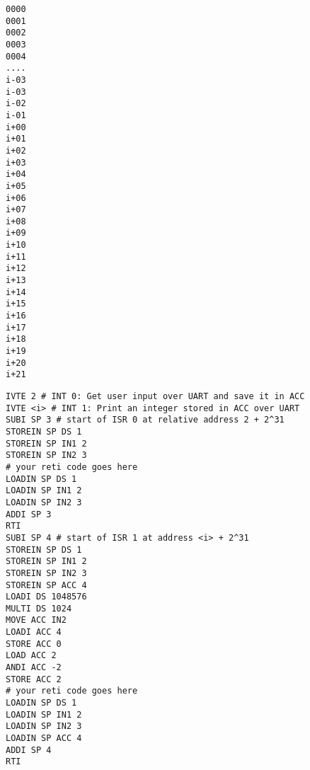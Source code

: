 \documentclass{article}
\newenvironment{adjustedminipage}[1]
{\vspace{0.1cm}\begin{minipage}[t]{#1}}
  {\end{minipage}\vspace{0.1cm}}
\begin{document}
\begin{adjustedminipage}{0.1\textwidth}
\begin{verbatim}
0000 
0001 
0002 
0003 
0004 
.... 
i-03 
i-03 
i-02 
i-01 
i+00 
i+01 
i+02 
i+03 
i+04 
i+05 
i+06 
i+07 
i+08 
i+09 
i+10 
i+11 
i+12 
i+13 
i+14 
i+15 
i+16 
i+17 
i+18 
i+19 
i+20 
i+21 
\end{verbatim}
\end{adjustedminipage}
\begin{adjustedminipage}{0.8\textwidth}
\begin{verbatim}
IVTE 2 # INT 0: Get user input over UART and save it in ACC
IVTE <i> # INT 1: Print an integer stored in ACC over UART 
SUBI SP 3 # start of ISR 0 at relative address 2 + 2^31    
STOREIN SP DS 1                                            
STOREIN SP IN1 2                                           
STOREIN SP IN2 3                                           
# your reti code goes here                                 
LOADIN SP DS 1                                             
LOADIN SP IN1 2                                            
LOADIN SP IN2 3                                            
ADDI SP 3                                                  
RTI                                                        
SUBI SP 4 # start of ISR 1 at address <i> + 2^31           
STOREIN SP DS 1                                            
STOREIN SP IN1 2                                           
STOREIN SP IN2 3                                           
STOREIN SP ACC 4                                           
LOADI DS 1048576                                           
MULTI DS 1024                                              
MOVE ACC IN2                                               
LOADI ACC 4                                                
STORE ACC 0                                                
LOAD ACC 2                                                 
ANDI ACC -2                                                
STORE ACC 2                                                
# your reti code goes here                                      
LOADIN SP DS 1                                             
LOADIN SP IN1 2                                            
LOADIN SP IN2 3                                            
LOADIN SP ACC 4                                            
ADDI SP 4                                                  
RTI                                                        
\end{verbatim}
\end{adjustedminipage}
\end{document}
